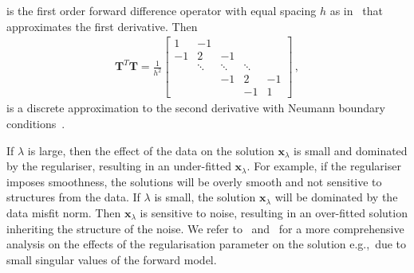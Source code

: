 is the first order forward difference operator with equal spacing $h$ as in~\cite{tan2016LecNot} that approximates the first derivative.
Then 
\begin{align}
	\bm{T}^T\bm{T} = \frac{1}{h^2}
	\begin{bmatrix}
		1 & -1 & & &  \\
		-1 & 2& -1 & &   \\
		& \ddots & \ddots & \ddots &\\ 
		& & -1 & 2 & -1  \\
		& & & -1 & 1 
	\end{bmatrix} \, ,
\label{eq:LaplRegTheo}
\end{align}
is a discrete approximation to the second derivative with Neumann boundary conditions~\cite{wang2015graphs}.

If $\lambda$ is large, then the effect of the data on the solution $\bm{x}_{\lambda}$ is small and dominated by the regulariser, resulting in an under-fitted $\bm{x}_{\lambda}$.
For example, if the regulariser imposes smoothness, the solutions will be overly smooth and not sensitive to structures from the data.
If $\lambda$ is small, the solution $\bm{x}_{\lambda}$ will be dominated by the data misfit norm.
Then $\bm{x}_{\lambda}$ is sensitive to noise, resulting in an over-fitted solution inheriting the structure of the noise.
We refer to~\cite{hansen1989GSVD} and~\cite{tan2016LecNot} for a more comprehensive analysis on the effects of the regularisation parameter on the solution e.g.,~due to small singular values of the forward model.


